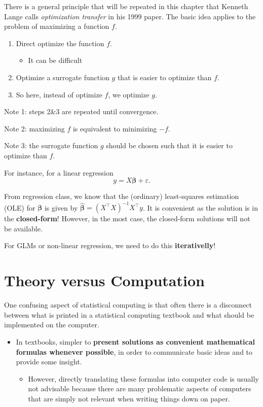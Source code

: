 \documentclass[
  letterpaper,
  DIV=11,
  numbers=noendperiod]{scrreprt}
\providecommand{\tightlist}{%
  \setlength{\itemsep}{0pt}\setlength{\parskip}{0pt}}
\begin{document}
There is a general principle that will be repeated in this chapter that
Kenneth Lange calls \emph{optimization transfer} in his 1999 paper. The
basic idea applies to the problem of maximizing a function \(f\).

\begin{enumerate}
\def\labelenumi{\arabic{enumi}.}
\tightlist
\item
  Direct optimize the function \(f\).

  \begin{itemize}
  \tightlist
  \item
    It can be difficult
  \end{itemize}
\item
  Optimize a surrogate function \(g\) that is easier to optimize than
  \(f\).
\item
  So here, instead of optimize \(f\), we optimize \(g\).
\end{enumerate}

Note 1: steps 2\&3 are repeated until convergence.

Note 2: maximizing \(f\) is equivalent to minimizing \(-f\).

Note 3: the surrogate function \(g\) should be chosen such that it is
easier to optimize than \(f\).

For instance, for a linear regression \begin{equation}
  y = X\boldsymbol{\beta} + \varepsilon. \label{eq:linmod}
\end{equation}

From regression class, we know that the (ordinary) least-squares
estimation (OLE) for \(\boldsymbol{\beta}\) is given by
\(\hat{\boldsymbol{\beta}}=(X^\top X)^{-1} X^\top y\). It is convenient
as the solution is in the \textbf{closed-form}! However, in the most
case, the closed-form solutions will not be available.

For GLMs or non-linear regression, we need to do this
\textbf{iterativelly}!

\section{Theory versus Computation}\label{theory-versus-computation}

One confusing aspect of statistical computing is that often there is a
disconnect between what is printed in a statistical computing textbook
and what should be implemented on the computer.

\begin{itemize}
\tightlist
\item
  In textbooks, simpler to \textbf{present solutions as convenient
  mathematical formulas whenever possible}, in order to communicate
  basic ideas and to provide some insight.

  \begin{itemize}
  \tightlist
  \item
    However, directly translating these formulas into computer code is
    usually not advisable because there are many problematic aspects of
    computers that are simply not relevant when writing things down on
    paper.
  \end{itemize}
\end{itemize}
\end{document}
